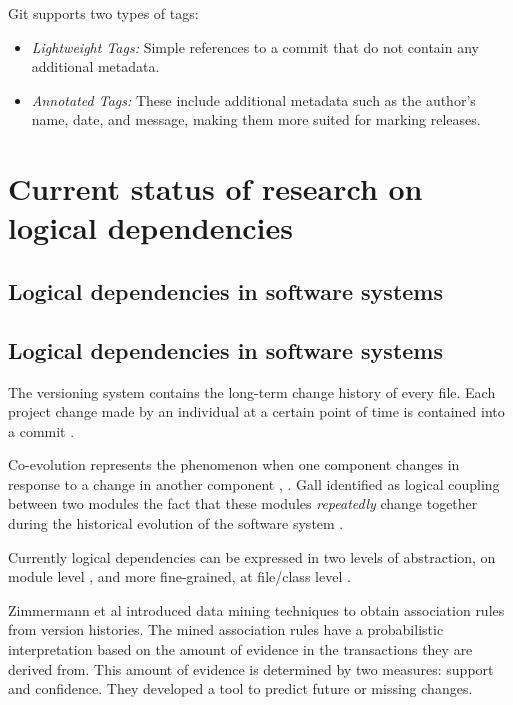 Git supports two types of tags:
\begin{itemize}
    \item \textit{Lightweight Tags:} Simple references to a commit that do not contain any additional metadata.
    \item \textit{Annotated Tags:} These include additional metadata such as the author's name, date, and message, making them more suited for marking releases.
\end{itemize}



\section{Current status of research on logical dependencies}
\label{ld-intro}

\subsection{Logical dependencies in software systems}

\subsection{Logical dependencies in software systems}

The versioning system contains the long-term change history of every file. Each project change made by an individual at a certain point of time is contained into a commit \cite{7471284}. 


Co-evolution represents the phenomenon when one component changes in response to a change in another component \cite{Yu:2007:UCC:1231330.1231370}, \cite{5166450}. Gall \cite{Gall:1998:DLC:850947.853338, Gall:2003:CRH:942803.943741, 6606615} identified as logical coupling between two modules the fact that these modules \textit{repeatedly} change together during the historical evolution of the software system . 



Currently logical dependencies can be expressed in two levels of abstraction, on module level \cite{LD-module, LD-module-new}, and more fine-grained, at file/class level \cite{CVS-LD, inproceedings-gall}.


Zimmermann et al \cite{Zimmermann:2004:MVH:998675.999460} introduced data mining techniques to obtain association rules from version histories.
The mined association rules  have a probabilistic interpretation based on the amount of evidence in the transactions they are derived from. This amount of evidence is determined by two measures: support and confidence.  They developed a tool to predict future or missing changes.


